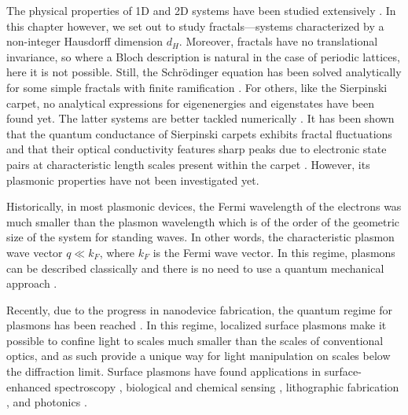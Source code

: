 The physical properties of 1D and 2D systems have been studied extensively \cite{lieb1966mathematical, giuliani2005quantum}. In this chapter however, we set out to study fractals---systems characterized by a non-integer Hausdorff dimension $d_H$. Moreover, fractals have no translational invariance, so where a Bloch description is natural in the case of periodic lattices, here it is not possible. Still, the Schr\"odinger equation has been solved analytically for some simple fractals with finite ramification \cite{kadanoff1983}. For others, like the Sierpinski carpet, no analytical expressions for eigenenergies and eigenstates have been found yet.  The latter systems are better tackled numerically \cite{percolation1996}. It has been shown that the quantum conductance of Sierpinski carpets exhibits fractal fluctuations \cite{transport2016} and that their optical conductivity features sharp peaks due to electronic state pairs at characteristic length scales present within the carpet \cite{optics2017}. However, its plasmonic properties have not been investigated yet.

Historically, in most plasmonic devices, the Fermi wavelength of the electrons was much smaller than the plasmon wavelength which is of the order of the geometric size of the system for standing waves. In other words, the characteristic plasmon wave vector $q \ll k_F$, where $k_F$ is the Fermi wave vector. In this regime, plasmons can be described classically and there is no need to use a quantum mechanical approach \cite{nozieres1999theory, platzman1973waves,Vonsov2012QuantumSolidS, giuliani2005quantum}.

Recently, due to the progress in nanodevice fabrication, the quantum regime for plasmons has been reached \cite{scholl2012quantum, tame2013quantum}. In this regime, localized surface plasmons make it possible to confine light to scales much smaller than the scales of conventional optics, and as such provide a unique way for light manipulation on scales below the diffraction limit. Surface plasmons have found applications in surface-enhanced spectroscopy \cite{raman2005, second-harmonic1994}, biological and chemical sensing \cite{towards2005}, lithographic fabrication \cite{nanolithography2004}, and photonics \cite{brongersma2007surface}.

